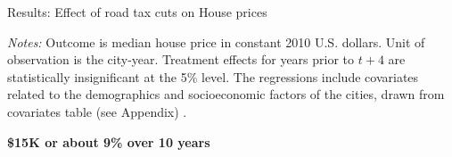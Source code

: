 \documentclass{beamer}
\begin{document}
\begin{frame}{Results: Effect of road tax cuts on House prices}
    \begin{table}[ht]
    \centering
    \caption{\scriptsize Effect on median house prices of failing to renew a road tax levy}
    \label{tab:median_sale_amount}
    \vspace{-0.2cm}
    \begin{tablenotes}
    \scriptsize
    \item \textit{Notes:} Outcome is median house price in constant 2010 U.S. dollars. Unit of observation is the city-year. Treatment effects for years prior to $t + 4$ are statistically insignificant at the 5\% level. The regressions include covariates related to the demographics and socioeconomic factors of the cities, drawn from covariates table (see Appendix) .
    \end{tablenotes}
    \end{table}
    {\bf \$15K or about 9\% over 10 years}
\end{frame}
\end{document}

